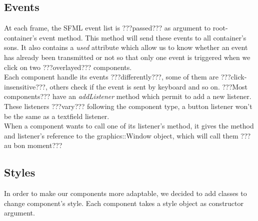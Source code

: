 \documentclass{scrreprt}
\begin{document}
	\subsection{Events}
	At each frame, the SFML event list is ???passed??? as argument to root-container's event method. This method will send these events to all container's sons. It also contains a \emph{used} attribute which allow us to know whether an event has already been transmitted or not so that only one event is triggered when we click on two ???overlayed??? components.\\

	Each component handle its events ???differently???, some of them are ???click-insensitive???, others check if the event is sent by keyboard and so on.
	???Most components??? have an \emph{addListener} method which permit to add a new listener. These listeners ???vary??? following the component type, a button listener won't be the same as a textfield listener.\\

	When a component wants to call one of its listener's method, it gives the method and listener's reference to the graphics::Window object, which will call them ???au bon moment???

	\subsection{Styles}
	In order to make our components more adaptable, we decided to add classes to change component's style. Each component takes a style object as constructor argument. 
\end{document}
